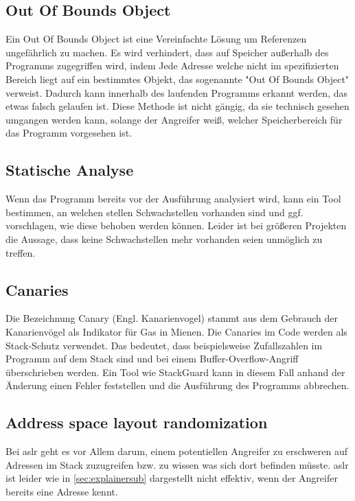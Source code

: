 \subsection{Out Of Bounds Object}
Ein Out Of Bounds Object ist eine Vereinfachte Lösung um Referenzen ungefährlich zu machen.
Es wird verhindert, dass auf Speicher außerhalb des Programms zugegriffen wird, indem Jede
Adresse welche nicht im spezifizierten Bereich liegt auf ein bestimmtes Objekt, das sogenannte
"Out Of Bounds Object" verweist. Dadurch kann innerhalb des laufenden Programms erkannt werden, das
etwas falsch gelaufen ist. Diese Methode ist nicht gängig, da sie technisch gesehen
umgangen werden kann, solange der Angreifer weiß, welcher Speicherbereich für das Programm
vorgesehen ist.

\subsection{Statische Analyse}
Wenn das Programm bereits vor der Ausführung analysiert wird, kann ein
Tool bestimmen, an welchen stellen Schwachstellen vorhanden sind und
ggf. vorschlagen, wie diese behoben werden können. Leider ist bei größeren
Projekten die Aussage, dass keine Schwachstellen mehr vorhanden seien
unmöglich zu treffen.

\subsection{Canaries}
Die Bezeichnung Canary (Engl. Kanarienvogel) stammt aus dem Gebrauch der Kanarienvögel als
Indikator für Gas in Mienen. Die Canaries im Code werden als Stack-Schutz verwendet. Das bedeutet,
dass beispielsweise Zufallszahlen im Programm auf dem Stack sind und bei einem Buffer-Overflow-Angriff
überschrieben werden. Ein Tool wie StackGuard kann in diesem Fall anhand der Änderung einen Fehler feststellen und
die Ausführung des Programms abbrechen.

\subsection{Address space layout randomization}
Bei \acrlong{aslr} geht es vor Allem darum, einem potentiellen Angreifer zu erschweren
auf Adressen im Stack zuzugreifen bzw. zu wissen was sich dort befinden müsste.
\acrshort{aslr} ist leider wie in \ref{sec:explainersub} dargestellt nicht effektiv, wenn der Angreifer
bereits eine Adresse kennt.

